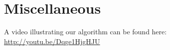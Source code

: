 \documentclass[letterpaper,12pt]{article}
\begin{document}

	\section{Miscellaneous}
		A video illustrating our algorithm can be found here:
		\url{http://youtu.be/Dqge1HjgHJU}
\end{document}
